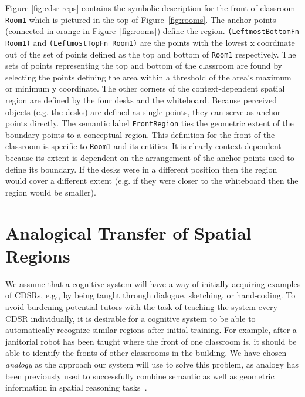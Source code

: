 \documentclass[letterpaper]{article}
\newcommand{\from}[2]{\textcolor{red}{\noindent\textbf{//}\textbf{Note
      from #1:}\textsc{ #2}\textbf{//}}}
\newcommand{\fw}[1]{\texttt{#1}}
\begin{document}
Figure \ref{fig:cdsr-reps} contains the symbolic description for the front of classroom \fw{Room1} which is pictured in the top of Figure~\ref{fig:rooms}. The anchor points (connected in orange in Figure~\ref{fig:rooms}) define the region. \fw{(LeftmostBottomFn Room1)} and \fw{(LeftmostTopFn Room1)} are the points with the lowest x coordinate out of the set of points defined as the top and bottom of \fw{Room1} respectively. The sets of points representing the top and bottom of the classroom are found by selecting the points defining the area within a threshold of the area's maximum or minimum y coordinate. The other corners of the context-dependent spatial region are defined by the four desks and the whiteboard. Because perceived objects (e.g. the desks) are defined as single points, they can serve as anchor points directly. The semantic label \fw{FrontRegion} ties the geometric extent of the boundary points to a conceptual region. This definition for the front of the classroom is specific to \fw{Room1} and its entities. It is clearly context-dependent because its extent is dependent on the arrangement of the anchor points used to define its boundary. If the desks were in a different position then the region would cover a different extent (e.g. if they were closer to the whiteboard then the region would be smaller). 



\section{Analogical Transfer of Spatial Regions}\label{sec:analogy}


We assume that a cognitive system will have a way of initially acquiring examples of CDSRs, e.g., by being taught through dialogue, sketching, or hand-coding. To avoid burdening potential tutors with the task of teaching the system every CDSR individually, it is desirable for a cognitive system to be able to automatically recognize similar regions after initial training. For example, after a janitorial robot has been taught where the front of one classroom is, it should be able to identify the fronts of other classrooms in the building. We have chosen \emph{analogy} as the approach our system will use to solve this problem, as analogy has been previously used to successfully combine semantic as well as geometric information in spatial reasoning tasks~\cite{Lockwood/etal2008}.
\end{document}
